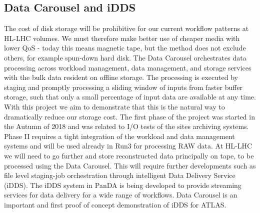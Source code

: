 \subsection{Data Carousel and iDDS}
The cost of disk storage will be prohibitive for our current workflow patterns at HL-LHC volumes. We must therefore make better use of cheaper media with lower QoS - today this means magnetic tape, but the method does not exclude others, for example spun-down hard disk.
The Data Carousel orchestrates data processing across workload
management, data management, and storage services with the bulk data
resident on offline storage. The processing is executed by staging and
promptly processing a sliding window of inputs from faster buffer storage,
such that only a small percentage of input data are available at any time. With this project we aim to demonstrate that this is the natural way to
dramatically reduce our storage cost. The first phase of the project was
started in the Autumn of 2018 and was related to I/O tests of the sites archiving
systems. Phase II requires a tight integration of the workload and data management systems and will be used already in Run3 for processing RAW data. At HL-LHC we will need to go further and store reconstructed data principally on tape, to be processed using the Data Carousel. This will require further developments such as 
file level staging-job orchestration through intelligent Data Delivery Service (iDDS). The iDDS system in PanDA is being developed to provide streaming services for data delivery for a wide range of workflows. Data Carousel is an important and first proof of concept demonstration of iDDS for ATLAS.




